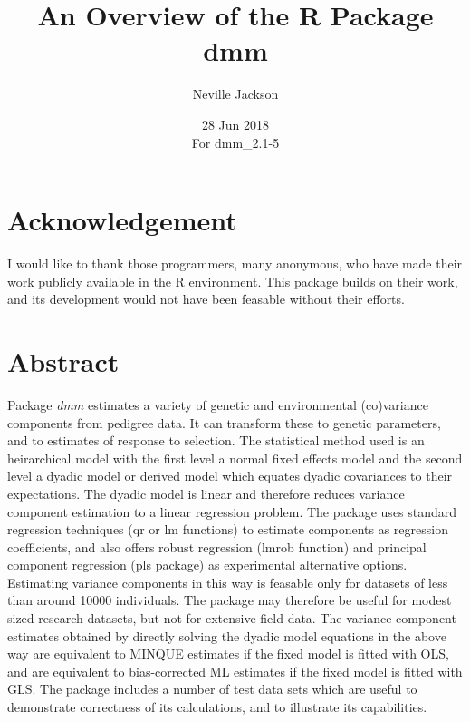 \documentclass[titlepage]{article}  %
\title{ An Overview of the R Package dmm}
\author{Neville Jackson }
\date{28 Jun 2018 \\
      For dmm\_2.1-5}   %
\begin{document}
 
 
\maketitle      
\tableofcontents

\clearpage
\section{Acknowledgement}
 I would like to thank those programmers, many anonymous, who have made their work
publicly available in the R environment. This package builds on their work, and its
 development would not have been feasable without their efforts.

\clearpage
\section{Abstract}
 Package {\em dmm} estimates a variety of genetic and environmental (co)variance
components from pedigree data. It can transform these to genetic parameters, and to estimates of response to selection. The statistical method used is an heirarchical model with the first level a normal fixed effects model and the second level a dyadic model or derived model which equates dyadic covariances to their expectations. The dyadic model is linear and therefore reduces variance component estimation to a linear regression problem. 
The package uses standard regression techniques (qr or lm functions) to estimate components as regression coefficients, and also offers robust regression (lmrob function) and principal component regression (pls package) as experimental alternative options.
Estimating variance components in this way is feasable only for datasets of less than around 10000 individuals. The package may therefore be useful for modest sized research datasets, but not for extensive field data. The variance component estimates obtained by directly solving the dyadic model equations in the above way are equivalent to MINQUE estimates if the fixed model is fitted with OLS, and are equivalent to bias-corrected ML estimates if the fixed model is fitted with GLS. The package includes a number of test data sets which are useful to demonstrate correctness of its calculations, and to illustrate its capabilities.

\clearpage
\end{document}
